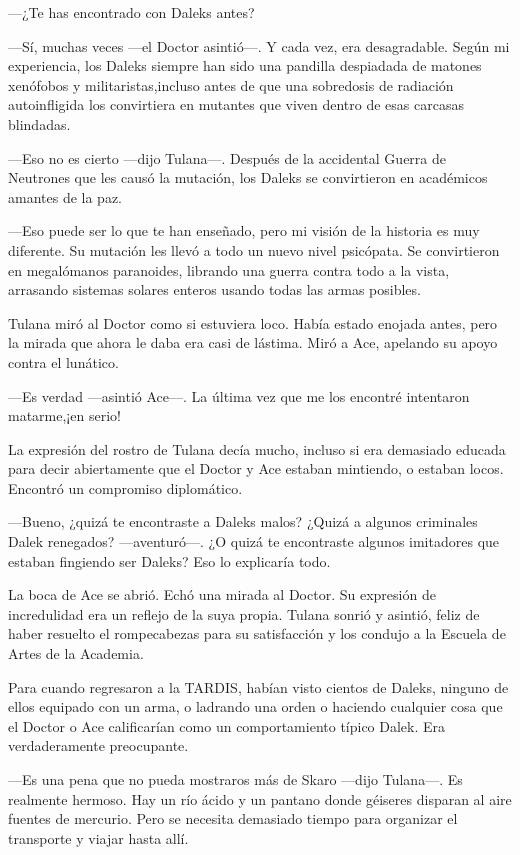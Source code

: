 ---¿Te has encontrado con Daleks antes?

---Sí, muchas veces ---el Doctor asintió---. Y cada vez, era
desagradable. Según mi experiencia, los Daleks siempre han sido una
pandilla despiadada de matones xenófobos y militaristas,incluso antes
de que una sobredosis de radiación autoinfligida los convirtiera en
mutantes que viven dentro de esas carcasas blindadas.

---Eso no es cierto ---dijo Tulana---. Después de la accidental
Guerra de Neutrones que les causó la mutación, los Daleks se
convirtieron en académicos amantes de la paz.

---Eso puede ser lo que te han enseñado, pero mi visión de la
historia es muy diferente. Su mutación les llevó a todo un nuevo nivel
psicópata. Se convirtieron en megalómanos paranoides, librando una
guerra contra todo a la vista, arrasando sistemas solares enteros usando
todas las armas posibles.

Tulana miró al Doctor como si estuviera loco. Había estado
enojada antes, pero la mirada que ahora le daba era casi de lástima.
Miró a Ace, apelando su apoyo contra el lunático.

---Es verdad ---asintió Ace---. La última vez que me los
encontré intentaron matarme,¡en serio!

La expresión del rostro de Tulana decía mucho, incluso si era
demasiado educada para decir abiertamente que el Doctor y Ace estaban
mintiendo, o estaban locos. Encontró un compromiso diplomático.

---Bueno, ¿quizá te encontraste a Daleks malos? ¿Quizá a algunos
criminales Dalek renegados? ---aventuró---. ¿O quizá te encontraste
algunos imitadores que estaban fingiendo ser Daleks? Eso lo explicaría
todo.

La boca de Ace se abrió. Echó una mirada al Doctor. Su expresión
de incredulidad era un reflejo de la suya propia. Tulana sonrió y
asintió, feliz de haber resuelto el rompecabezas para su satisfacción y
los condujo a la Escuela de Artes de la Academia.

Para cuando regresaron a la TARDIS, habían visto cientos de
Daleks, ninguno de ellos equipado con un arma, o ladrando una orden o
haciendo cualquier cosa que el Doctor o Ace calificarían como un
comportamiento típico Dalek. Era verdaderamente preocupante.

---Es una pena que no pueda mostraros más de Skaro ---dijo
Tulana---. Es realmente hermoso. Hay un río ácido y un pantano donde
géiseres disparan al aire fuentes de mercurio. Pero se necesita
demasiado tiempo para organizar el transporte y viajar hasta allí.

